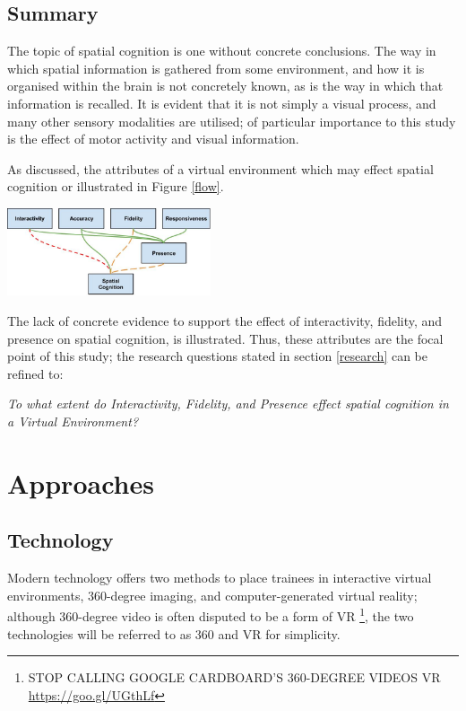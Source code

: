 \documentclass[a4paper, openright, twoside]{report}
\begin{document}
\subsection{Summary}\label{intro-summary}
The topic of spatial cognition is one without concrete conclusions. The way in which spatial information is gathered from some environment, and how it is organised within the brain is not concretely known, as is the way in which that information is recalled. It is evident that it is not simply a visual process, and many other sensory modalities are utilised; of particular importance to this study is the effect of motor activity and visual information. 

As discussed, the attributes of a virtual environment which may effect spatial cognition or illustrated in Figure \ref{flow}.
\begin{center}
\hfill \break
\includegraphics[width=0.45\textwidth]{images/spatial_cognition_flow.png}
\label{flow}
\hfill \break
\end{center}

The lack of concrete evidence to support the effect of interactivity, fidelity, and presence on spatial cognition, is illustrated.  Thus, these attributes are the focal point of this study; the research questions stated in section \ref{research} can be refined to:

\textit{To what extent do Interactivity, Fidelity, and Presence effect spatial cognition in a Virtual Environment?}


\section{Approaches}

\subsection{Technology}
Modern technology offers two methods to place trainees in interactive virtual environments, 360-degree imaging, and computer-generated virtual reality; although 360-degree video is often disputed to be a form of VR \footnote{STOP CALLING GOOGLE CARDBOARD'S 360-DEGREE VIDEOS VR \url{https://goo.gl/UGthLf}}, the two technologies will be referred to as 360 and VR for simplicity.
\end{document}
